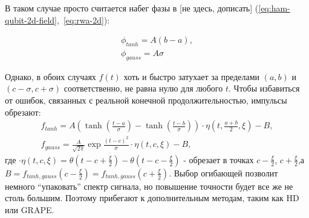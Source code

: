\documentclass[12pt, twoside]{report}
\numberwithin{equation}{section}
\numberwithin{figure}{section}
\begin{document}
В таком случае просто считается набег фазы в [не здесь, дописать] (\ref{eq:ham-qubit-2d-field},~\ref{eq:rwa-2d}):

\begin{gather*}
\phi_{tanh} = A \left( b - a \right), \\
\phi_{gauss} = A \sigma
\end{gather*}

Однако, в обоих случаях $f(t)$ хоть и быстро затухает за пределами $(a,b)$ и $(c-\sigma,c+\sigma)$ соответственно, не равна нулю для любого $t$. Чтобы избавиться от ошибок, связанных с реальной конечной продолжительностью, импульсы обрезают:
\begin{gather*}
f_{tanh} = A \left( \tanh \left( \frac{t-a}{\sigma} \right) - \tanh \left( \frac{t-b}{\sigma} \right) \right) \cdot \eta \left(t, \frac{a+b}{2}, \xi \right) - B, \label{pulse:tanh-cut} \\
f_{gauss} = \frac{A}{\sqrt{2 \pi}}  \exp\frac{ \left( t - c\right)^2}{\sigma} \cdot \eta \left(t, c, \xi \right) - B, \label{pulse:gauss-cut}
\end{gather*}
где $\cdot \eta \left(t, c, \xi \right) = \theta(t-c+\frac{\xi}{2}) - \theta(t-c-\frac{\xi}{2})$ - обрезает в точках $c-\frac{\xi}{2}$, $c+\frac{\xi}{2}$,\newline а $B =f_{tanh,gauss}(c-\frac{\xi}{2}) = f_{tanh,gauss}(c+\frac{\xi}{2})$.
\newline
Выбор огибающей позволит немного ``упаковать'' спектр сигнала, но повышение точности будет все же не столь большим. Поэтому прибегают к дополнительным методам, таким как HD или GRAPE.
\end{document}
